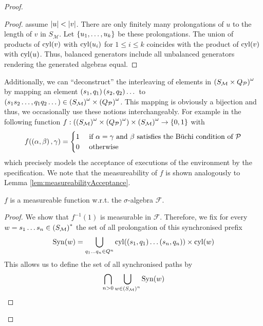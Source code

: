 \begin{proof}
\begin{proof}
  assume $\left\vert{u}\right\vert<\left\vert{v}\right\vert$. There are only finitely many prolongations of $u$
  to the length of $v$ in $S_{\mathcal{M}}$. Let $\left\{u_{1},\dots,u_{k}\right\}$ be
  these prolongations. The union of products of $\operatorname{cyl}(v)$ with $\operatorname{cyl}(u_{i})$
  for $1\leq i\leq k$ coincides with the product of $\operatorname{cyl}(v)$ with $\operatorname{cyl}(u)$.
  Thus, balanced generators include all unbalanced generators rendering the
  generated algebras equal.
\end{proof}
Additionally, we can \enquote{deconstruct} the interleaving of elements in
$\left(S_{\mathcal{M}}\times Q_{\mathcal{P}}\right)^{\omega}$ by mapping an element
$\left(s_{1},q_{1}\right)\left(s_{2},q_{2}\right)\dots$ to
$\left(s_{1}s_{2}\dots,q_{1}q_{2}\dots\right)\in
\left(S_{\mathcal{M}}\right)^{\omega}\times\left(Q_{\mathcal{P}}\right)^{\omega}$. This
mapping is obviously a bijection and thus, we occasionally use these notions
interchangeably. For example in the following function
$f:\left(\left(S_{\mathcal{M}}\right)^{\omega}\times
\left(Q_{\mathcal{P}}\right)^{\omega}\right)\times\left(S_{\mathcal{M}}\right)^{\omega}
\rightarrow\left\{0,1\right\}$ with
\begin{equation*}
  f(\left(\alpha,\beta\right),\gamma) =
  \begin{cases}
    1&\text{ if }\alpha = \gamma\text{ and }\beta
    \text{ satisfies the Büchi condition of }\mathcal{P}\\
    0&\text{ otherwise}
  \end{cases}
\end{equation*}
which precisely models the acceptance of executions of the environment by the
specification. We note that the measureability of $f$ is shown analogously to
Lemma \ref{lem:measureabilityAcceptance}.
\begin{lemma}
  $f$ is a measureable function w.r.t. the $\sigma$-algebra $\mathcal{F}$.
\end{lemma}
\begin{proof}
  We show that $f^{-1}(1)$ is measurable in $\mathcal{F}$. Therefore, we fix
  for every $w = s_{1}\dots s_{n}\in \left(S_{\mathcal{M}}\right)^{*}$ the set of
  all prolongation of this synchronised prefix
  \begin{equation*}
    \operatorname{Syn}(w) = \bigcup_{q_{1}\dots q_{n}\in Q^{n}}\operatorname{cyl}(\left(s_{1},q_{1}\right)\dots
    \left(s_{n},q_{n}\right))\times\operatorname{cyl}(w)
  \end{equation*}
  This allows us to define the set of all synchronised paths by
  \begin{equation*}
    \bigcap_{n>0}\bigcup_{w\in \left(S_{\mathcal{M}}\right)^{n}}\operatorname{Syn}(w)
  \end{equation*}

\end{proof}
\end{proof}
